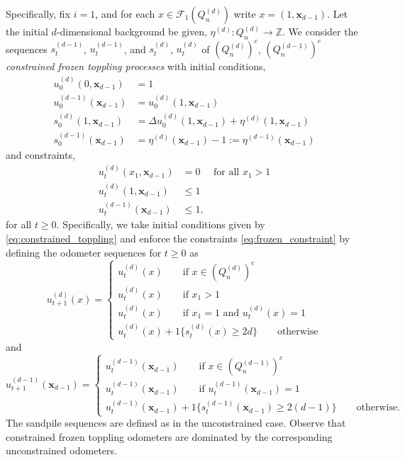 \documentclass[aap]{imsart}
\newcommand{\Z}{\mathbb{Z}}
\begin{document}
Specifically, fix $i = 1$,  and for each $x \in \mathcal{F}_{1}(Q_n^{(d)})$ write $x = (1, \mathbf{x}_{d-1})$. 
Let the initial $d$-dimensional background be given, $\eta^{(d)}: Q_n^{(d)} \to \Z$. 
We consider the sequences $s_t^{(d-1)}$, $u_t^{(d-1)}$, and $s_t^{(d)}$, $u_t^{(d)}$ of $(Q_n^{(d)})^c$, $(Q_n^{(d-1)})^c$ {\it constrained  frozen toppling processes} with initial conditions,
\begin{equation} \label{eq:constrained_toppling}
\begin{aligned}
u_0^{(d)}(0,\mathbf{x}_{d-1}) &= 1 \\
u_0^{(d-1)}(\mathbf{x}_{d-1}) &= u_0^{(d)}(1, \mathbf{x}_{d-1}) \\
s_0^{(d)}(1, \mathbf{x}_{d-1}) &=  \Delta u_0^{(d)}(1, \mathbf{x}_{d-1}) + \eta^{(d)}(1,\mathbf{x}_{d-1}) \\
s_0^{(d-1)}(\mathbf{x}_{d-1}) &=  \eta^{(d)}(\mathbf{x}_{d-1})-1 := \eta^{(d-1)}(\mathbf{x}_{d-1})
\end{aligned}
\end{equation}
and constraints,
\begin{equation} \label{eq:frozen_constraint}
\begin{aligned}
u_t^{(d)}(x_1,\mathbf{x}_{d-1}) &= 0 \quad \mbox{ for all $x_1 > 1$} \\
u_t^{(d)}(1, \mathbf{x}_{d-1}) & \leq 1 \\
u_t^{(d-1)}(\mathbf{x}_{d-1}) &\leq 1,
\end{aligned}
\end{equation}
for all $t \geq 0$. Specifically, we take initial conditions given by \eqref{eq:constrained_toppling}
and enforce the constraints \eqref{eq:frozen_constraint} by defining the odometer sequences for $t \geq 0$ as
\[
u_{t+1}^{(d)}(x) = 
\begin{cases}
u_t^{(d)}(x) \qquad \mbox{if $x \in (Q_n^{(d)})^c$} \\
u_t^{(d)}(x) \qquad \mbox{if $x_1 > 1$} \\
u_t^{(d)}(x) \qquad \mbox{if $x_1 = 1$ and $u_t^{(d)}(x)  = 1$} \\
u_t^{(d)}(x) + 1\{s_t^{(d)}(x) \geq 2 d\} \qquad \mbox{otherwise}
\end{cases}
\]
and
\[
u_{t+1}^{(d-1)}(\mathbf x_{d-1}) = 
\begin{cases}
u_t^{(d-1)}(\mathbf x_{d-1}) \qquad \mbox{if $x \in (Q_n^{(d-1)})^c$} \\
u_t^{(d-1)}(\mathbf x_{d-1}) \qquad \mbox{if $u_t^{(d-1)}(\mathbf{x}_{d-1}) = 1$} \\
u_t^{(d-1)}(\mathbf x_{d-1}) + 1\{s_t^{(d-1)}(\mathbf x_{d-1}) \geq 2 (d-1)\} \qquad \mbox{otherwise}.
\end{cases}
\]
The sandpile sequences are defined as in the unconstrained case. 
Observe that constrained frozen toppling odometers are dominated by the corresponding unconstrained odometers.
\end{document}

